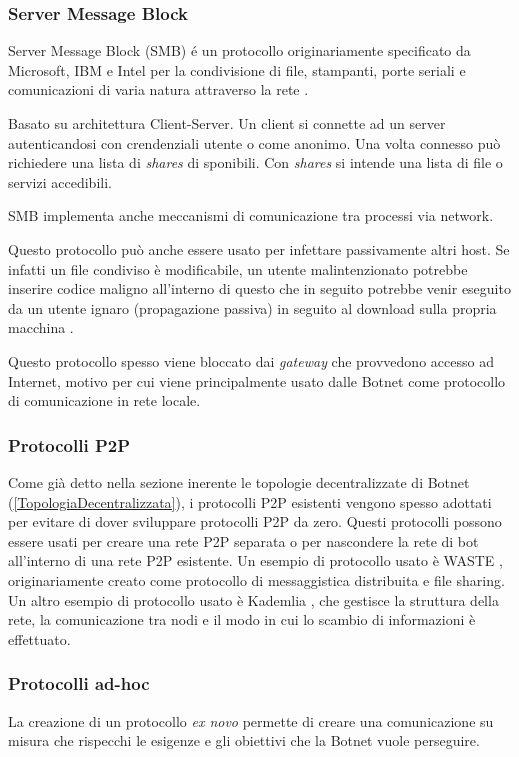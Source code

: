 \subsubsection{Server Message Block}
Server Message Block (SMB) é un protocollo  originariamente specificato da Microsoft, IBM e Intel per la condivisione di file, stampanti, porte seriali e comunicazioni di varia natura attraverso la rete \cite{SMB}.

Basato su architettura Client-Server. Un client si connette ad un server autenticandosi con crendenziali utente o come anonimo. Una volta connesso può richiedere una lista di \textit{shares} di sponibili. Con \textit{shares} si intende una lista di file o servizi accedibili.

SMB implementa anche meccanismi di comunicazione tra processi via network.

Questo protocollo può anche essere usato per infettare passivamente altri host. Se infatti un file condiviso è modificabile, un utente malintenzionato potrebbe inserire codice maligno all'interno di questo  che in seguito  potrebbe venir eseguito da un utente ignaro (propagazione passiva) in seguito al download  sulla propria macchina .

Questo protocollo spesso viene bloccato dai \textit{gateway} che provvedono accesso ad Internet, motivo per cui viene principalmente usato dalle Botnet come protocollo di comunicazione in rete locale.

\subsubsection{Protocolli P2P}
Come già detto nella sezione inerente le topologie decentralizzate di Botnet (\ref{TopologiaDecentralizzata}), i protocolli P2P esistenti vengono spesso adottati per evitare di dover sviluppare protocolli P2P da zero. Questi protocolli possono  essere usati per creare una rete P2P separata o per nascondere la rete di bot all'interno di una rete P2P esistente.
Un esempio di protocollo usato è WASTE \cite{WASTE}, originariamente creato come protocollo di messaggistica distribuita e file sharing. Un altro esempio di protocollo usato è Kademlia \cite{maymounkov2002kademlia}, che gestisce la struttura della rete, la comunicazione tra nodi e il modo in cui lo scambio di informazioni è effettuato.

\subsubsection{Protocolli ad-hoc}
La creazione di un protocollo \textit{ex novo} permette di creare una comunicazione su misura che rispecchi le esigenze e gli obiettivi che la Botnet vuole perseguire. 

